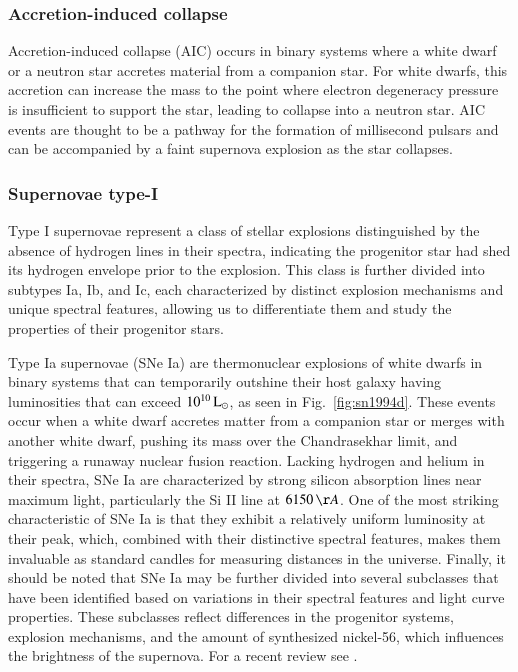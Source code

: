\documentclass[main.tex]{subfiles}
\begin{document}
    \subsubsection{Accretion-induced collapse}
    Accretion-induced collapse (AIC) occurs in binary systems where a white dwarf or a neutron star accretes material from a companion star. For white dwarfs, this accretion can increase the mass to the point where electron degeneracy pressure is insufficient to support the star, leading to collapse into a neutron star. AIC events are thought to be a pathway for the formation of millisecond pulsars and can be accompanied by a faint supernova explosion as the star collapses.
    
    \subsubsection{Supernovae type-I}
    Type I supernovae represent a class of stellar explosions distinguished by the absence of hydrogen lines in their spectra, indicating the progenitor star had shed its hydrogen envelope prior to the explosion. This class is further divided into subtypes Ia, Ib, and Ic, each characterized by distinct explosion mechanisms and unique spectral features, allowing us to differentiate them and study the properties of their progenitor stars.

    Type Ia supernovae (SNe Ia) are thermonuclear explosions of white dwarfs in binary systems that can temporarily outshine their host galaxy having luminosities that can exceed $10^{10}\mathrm{\,L_\odot}$, as seen in Fig.~\ref{fig:sn1994d}. These events occur when a white dwarf accretes matter from a companion star or merges with another white dwarf, pushing its mass over the Chandrasekhar limit, and triggering a runaway nuclear fusion reaction. Lacking hydrogen and helium in their spectra, SNe Ia are characterized by strong silicon absorption lines near maximum light, particularly the Si II line at $6150\,\AA$. One of the most striking characteristic of SNe Ia is that they exhibit a relatively uniform luminosity at their peak, which, combined with their distinctive spectral features, makes them invaluable as standard candles for measuring distances in the universe. Finally, it should be noted that SNe Ia may be further divided into several subclasses that have been identified based on variations in their spectral features and light curve properties. These subclasses reflect differences in the progenitor systems, explosion mechanisms, and the amount of synthesized nickel-56, which influences the brightness of the supernova. For a recent review see \cite{Liu_2023}.
\end{document}
